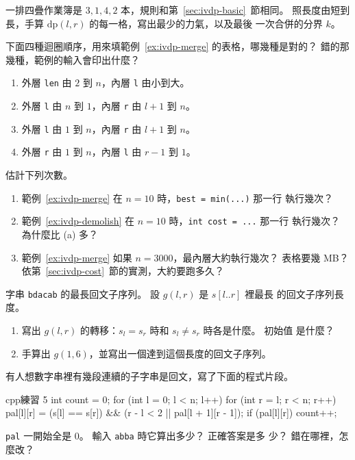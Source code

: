 \begin{drills}[label=drills:ivdp]
\item 一排四疊作業簿是 $3, 1, 4, 2$ 本，規則和第~\ref{sec:ivdp-basic}~節相同。
照長度由短到長，手算 $\mathrm{dp}(l, r)$ 的每一格，寫出最少的力氣，以及最後
一次合併的分界 $k$。

\item 下面四種迴圈順序，用來填範例~\ref{ex:ivdp-merge} 的表格，哪幾種是對的？
錯的那幾種，範例的輸入會印出什麼？
\begin{enumerate}
\item 外層 \texttt{len} 由 $2$ 到 $n$，內層 \texttt{l} 由小到大。
\item 外層 \texttt{l} 由 $n$ 到 $1$，內層 \texttt{r} 由 $l + 1$ 到 $n$。
\item 外層 \texttt{l} 由 $1$ 到 $n$，內層 \texttt{r} 由 $l + 1$ 到 $n$。
\item 外層 \texttt{r} 由 $1$ 到 $n$，內層 \texttt{l} 由 $r - 1$ 到 $1$。
\end{enumerate}

\item 估計下列次數。
\begin{enumerate}
\item 範例~\ref{ex:ivdp-merge} 在 $n = 10$ 時，\texttt{best = min(...)} 那一行
執行幾次？
\item 範例~\ref{ex:ivdp-demolish} 在 $n = 10$ 時，\texttt{int cost = ...} 那一行
執行幾次？ 為什麼比 (a) 多？
\item 範例~\ref{ex:ivdp-merge} 如果 $n = 3000$，最內層大約執行幾次？ 表格要幾
MB？ 依第~\ref{sec:ivdp-cost}~節的實測，大約要跑多久？
\end{enumerate}

\item 字串 \texttt{bdacab} 的最長回文子序列。 設 $g(l, r)$ 是 $s[l..r]$ 裡最長
的回文子序列長度。
\begin{enumerate}
\item 寫出 $g(l, r)$ 的轉移：$s_l = s_r$ 時和 $s_l \ne s_r$ 時各是什麼。 初始值
是什麼？
\item 手算出 $g(1, 6)$，並寫出一個達到這個長度的回文子序列。
\end{enumerate}

\item 有人想數字串裡有幾段連續的子字串是回文，寫了下面的程式片段。
\begin{code}{cpp}{練習 5}
int count = 0;
for (int l = 0; l < n; l++) {
    for (int r = l; r < n; r++) {
        pal[l][r] = (s[l] == s[r]) && (r - l < 2 || pal[l + 1][r - 1]);
        if (pal[l][r]) {
            count++;
        }
    }
}
\end{code}
\texttt{pal} 一開始全是 $0$。 輸入 \texttt{abba} 時它算出多少？ 正確答案是多
少？ 錯在哪裡，怎麼改？


\end{drills}
